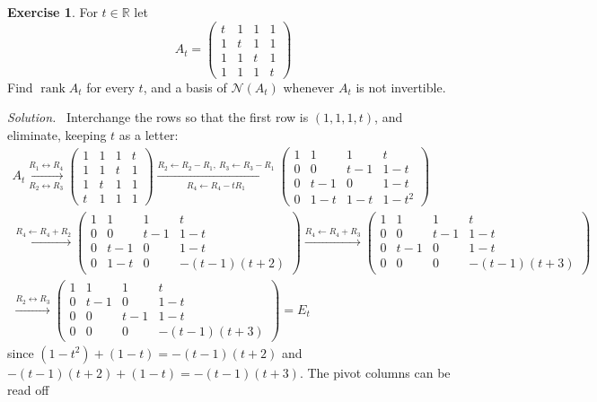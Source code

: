 \documentclass[12pt]{article}
\newcommand{\R}{\mathbb R}
\DeclareMathOperator{\rank}{rank}
\theoremstyle{definition}
\newtheorem{exercise}{Exercise}
\newenvironment{solution}{\par\noindent\textit{Solution.}\ }{\par\smallskip}
\begin{document}
\begin{exercise}\label{ex:r4-rank-parameter}
For \(t\in\R\) let
\[
A_t=\begin{pmatrix}t&1&1&1\\1&t&1&1\\1&1&t&1\\1&1&1&t\end{pmatrix}
\]
Find \(\rank A_t\) for every \(t\), and a basis of \(\mathcal N(A_t)\) whenever \(A_t\) is not
invertible.
\end{exercise}
\begin{solution}
Interchange the rows so that the first row is \((1,1,1,t)\), and eliminate, keeping \(t\) as a letter:
\[
\begin{gathered}
A_t\xrightarrow[R_2\leftrightarrow R_3]{R_1\leftrightarrow R_4}
\begin{pmatrix}1&1&1&t\\1&1&t&1\\1&t&1&1\\t&1&1&1\end{pmatrix}
\xrightarrow[R_4\leftarrow R_4-tR_1]{R_2\leftarrow R_2-R_1,\ R_3\leftarrow R_3-R_1}
\begin{pmatrix}1&1&1&t\\0&0&t-1&1-t\\0&t-1&0&1-t\\0&1-t&1-t&1-t^2\end{pmatrix}
\\
\xrightarrow{R_4\leftarrow R_4+R_2}
\begin{pmatrix}1&1&1&t\\0&0&t-1&1-t\\0&t-1&0&1-t\\0&1-t&0&-(t-1)(t+2)\end{pmatrix}
\xrightarrow{R_4\leftarrow R_4+R_3}
\begin{pmatrix}1&1&1&t\\0&0&t-1&1-t\\0&t-1&0&1-t\\0&0&0&-(t-1)(t+3)\end{pmatrix}
\\
\xrightarrow{R_2\leftrightarrow R_3}
\begin{pmatrix}1&1&1&t\\0&t-1&0&1-t\\0&0&t-1&1-t\\0&0&0&-(t-1)(t+3)\end{pmatrix}=E_t
\end{gathered}
\]
since \((1-t^2)+(1-t)=-(t-1)(t+2)\) and \(-(t-1)(t+2)+(1-t)=-(t-1)(t+3)\). The pivot columns can be read off

\end{solution}
\end{document}
